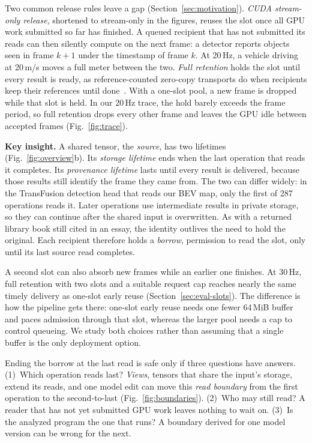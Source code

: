 \documentclass[conference]{IEEEtran}
\newcommand{\MiB}{\,MiB}
\newcommand{\Hz}{\,Hz}
\begin{document}
Two common release rules leave a gap (Section~\ref{sec:motivation}). \emph{CUDA stream-only release}, shortened to stream-only in the figures, reuses the slot once all GPU work submitted so far has finished. A queued recipient that has not submitted its reads can then silently compute on the next frame: a detector reports objects seen in frame $k{+}1$ under the timestamp of frame $k$. At 20\Hz, a vehicle driving at 20\,m/s moves a full meter between the two. \emph{Full retention} holds the slot until every result is ready, as reference-counted zero-copy transports do when recipients keep their references until done~\cite{iceoryx,agnocast}. With a one-slot pool, a new frame is dropped while that slot is held. In our 20\Hz{} trace, the hold barely exceeds the frame period, so full retention drops every other frame and leaves the GPU idle between accepted frames (Fig.~\ref{fig:trace}).

\textbf{Key insight.} A shared tensor, the \emph{source}, has two lifetimes (Fig.~\ref{fig:overview}b). Its \emph{storage lifetime} ends when the last operation that reads it completes. Its \emph{provenance lifetime} lasts until every result is delivered, because those results still identify the frame they came from. The two can differ widely: in the TransFusion detection head that reads our BEV map, only the first of 287 operations reads it. Later operations use intermediate results in private storage, so they can continue after the shared input is overwritten. As with a returned library book still cited in an essay, the identity outlives the need to hold the original. Each recipient therefore holds a \emph{borrow}, permission to read the slot, only until its last source read completes.

A second slot can also absorb new frames while an earlier one finishes. At 30\Hz, full retention with two slots and a suitable request cap reaches nearly the same timely delivery as one-slot early reuse (Section~\ref{sec:eval-slots}). The difference is how the pipeline gets there: one-slot early reuse needs one fewer 64\MiB{} buffer and paces admission through that slot, whereas the larger pool needs a cap to control queueing. We study both choices rather than assuming that a single buffer is the only deployment option.

Ending the borrow at the last read is safe only if three questions have answers. (1)~Which operation reads last? \emph{Views}, tensors that share the input's storage, extend its reads, and one model edit can move this \emph{read boundary} from the first operation to the second-to-last (Fig.~\ref{fig:boundaries}). (2)~Who may still read? A reader that has not yet submitted GPU work leaves nothing to wait on. (3)~Is the analyzed program the one that runs? A boundary derived for one model version can be wrong for the next.
\end{document}
